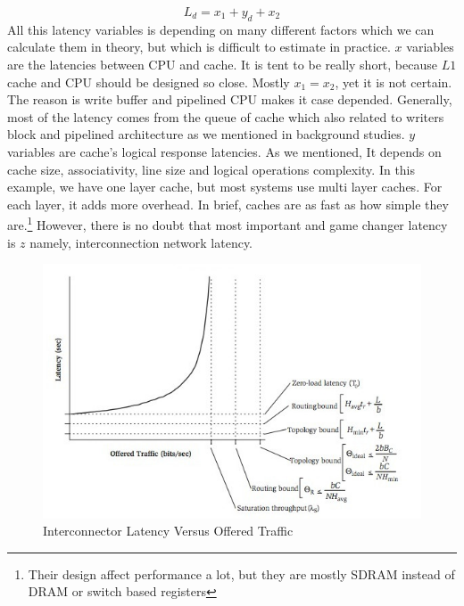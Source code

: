 \begin{equation}
L_{d}=x_{1} + y_{d} + x_{2}
\end{equation}
All this latency variables is depending on many different factors which we can calculate them in theory, but which is difficult to estimate in practice. $x$ variables are the latencies between CPU and cache. It is tent to be really short, because $L1$ cache and CPU should be designed so close. Mostly $x_{1} = x_{2}$, yet it is not certain. The reason is write buffer and pipelined CPU makes it case depended. Generally, most of the latency comes from the queue of cache which also related to writers block and pipelined architecture as we mentioned in background studies. $y$ variables are cache's logical response latencies. As we mentioned, It depends on cache size, associativity, line size and logical operations complexity. In this example, we have one layer cache, but most systems use multi layer caches. For each layer, it adds more overhead. In brief, caches are as fast as how simple they are.\footnote{Their design affect performance a lot, but they are mostly SDRAM instead of DRAM or switch based registers} However, there is no doubt that most important and game changer latency is $z$ namely, interconnection network latency. 
	\begin{figure}[h!]
	    \centering
	    \includegraphics[width=1.1\textwidth]{img/latency_graph.jpg}
	    \caption{Interconnector Latency Versus Offered Traffic \cite{0122007514}}
	    \label{fig:latencyvsofferedtraffic}
	\end{figure}
